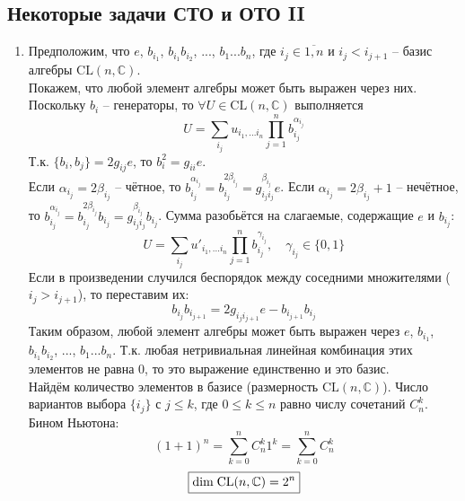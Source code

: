 \documentclass[12pt]{article}
\begin{document}
\subsection{Некоторые задачи СТО и ОТО II}
\begin{enumerate}
    \item Предположим, что $e$, $b_{i_1}$, $b_{i_1}b_{i_2}$, ..., $b_1...b_n$, где $i_j\in \overline{1,n}$ и $i_j<i_{j+1}$ -- базис алгебры $\text{CL}(n,\mathbb{C})$.\\
    Покажем, что любой элемент алгебры может быть выражен через них. Поскольку $b_i$ -- генераторы, то $\forall U\in\text{CL}(n,\mathbb{C})$ выполняется
    \begin{equation}
        U=\sum\limits_{i_j}u_{i_1,...i_n}\prod_{j=1}^nb_{i_j}^{\alpha_{i_j}}
    \end{equation}
    Т.к. $\{b_i,b_j\}=2g_{ij}e$, то $b_i^2=g_{ii}e$.\\
    Если $\alpha_{i_j}=2\beta_{i_j}$ -- чётное, то $b_{i_j}^{\alpha_{i_j}}=b_{i_j}^{2\beta_{i_j}}=g_{i_ji_j}^{\beta_{i_j}}e$. Если $\alpha_{i_j}=2\beta_{i_j}+1$ -- нечётное, то $b_{i_j}^{\alpha_{i_j}}=b_{i_j}^{2\beta_{i_j}}b_{i_j}=g_{i_ji_j}^{\beta_{i_j}}b_{i_j}$. Сумма разобьётся на слагаемые, содержащие $e$ и $b_{i_j}$:
    \begin{equation}
        U=\sum\limits_{i_j}u'_{i_1,...i_n}\prod_{j=1}^nb_{i_j}^{\gamma_{i_j}},\quad \gamma_{i_j}\in\{0,1\}
    \end{equation}
    Если в произведении случился беспорядок между соседними множителями ($i_j>i_{j+1}$), то переставим их:
    \begin{equation}
        b_{i_j}b_{i_{j+1}}=2g_{i_ji_{j+1}}e-b_{i_{j+1}}b_{i_j}
    \end{equation}
    Таким образом, любой элемент алгебры может быть выражен через $e$, $b_{i_1}$, $b_{i_1}b_{i_2}$, ..., $b_1...b_n$. Т.к. любая нетривиальная линейная комбинация этих элементов не равна 0, то это выражение единственно и это базис.\\
    Найдём количество элементов в базисе (размерность $\text{CL}(n,\mathbb{C})$). Число вариантов выбора $\{i_j\}$ с $j\leq k$, где $0\leq k\leq n$ равно числу сочетаний $C_n^k$. Бином Ньютона:
    \begin{equation}
        (1+1)^n=\sum_{k=0}^nC_n^k1^k=\sum_{k=0}^nC_n^k
    \end{equation}
    \begin{equation}
        \boxed{\text{dim\;CL}(n,\mathbb{C})=2^n}
    \end{equation}

\end{enumerate}
\end{document}
